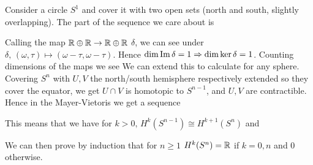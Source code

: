 \documentclass{article}
\begin{document}
\begin{example}
Consider a circle $S^1$ and cover it with two open sets (north and south, slightly overlapping). The part of the sequence we care about is 
			\begin{center}
	\end{center}
Calling the map $\mathbb{R} \oplus \mathbb{R} \to \mathbb{R} \oplus \mathbb{R}$ $\delta$, we can see under $\delta, \, (\omega,\tau) \mapsto (\omega-\tau,\omega-\tau)$. Hence $\dim \operatorname{Im} \delta = 1 \Rightarrow \dim \ker \delta = 1$. Counting dimensions of the maps we see 
We can extend this to calculate for any sphere. Covering $S^n$ with $U,V$ the north/south hemisphere respectively extended so they cover the equator, we get $U\cap V$ is homotopic to $S^{n-1}$, and $U,V$ are contractible. Hence in the Mayer-Vietoris we get a sequence
			\begin{center}
\end{center}
This means that we have for $k>0, \, H^k(S^{n-1})\cong H^{k+1}(S^{n})$ and
			\begin{center}
\end{center}
We can then prove by induction that for $n \geq 1$ $H^k(S^n) = \mathbb{R}$ if $k=0,n$ and 0 otherwise. 
\end{example}
\end{document}
